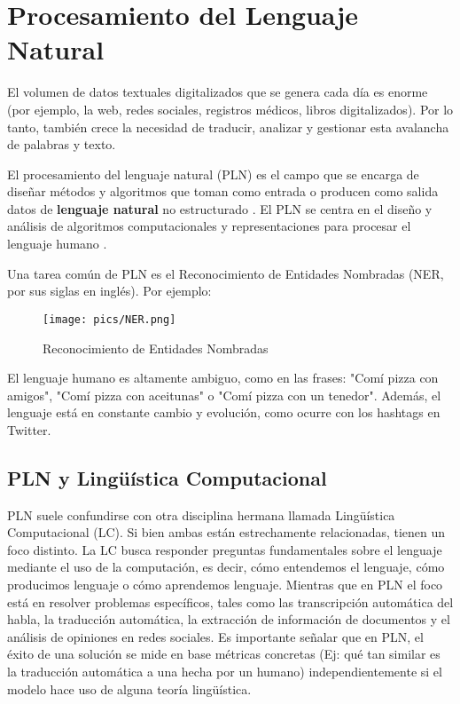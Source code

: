 \documentclass{book}
\begin{document}
\chapter{Procesamiento del Lenguaje Natural}

El volumen de datos textuales digitalizados que se genera cada día es enorme (por ejemplo, la web, redes sociales, registros médicos, libros digitalizados). Por lo tanto, también crece la necesidad de traducir, analizar y gestionar esta avalancha de palabras y texto.

El procesamiento del lenguaje natural (PLN) es el campo que se encarga de diseñar métodos y algoritmos que toman como entrada o producen como salida datos de \textbf{lenguaje natural} no estructurado \cite{goldberg2017neural}. El PLN se centra en el diseño y análisis de algoritmos computacionales y representaciones para procesar el lenguaje humano \cite{jacobbook}.





Una tarea común de PLN es el Reconocimiento de Entidades Nombradas (NER, por sus siglas en inglés). Por ejemplo:

\begin{figure}[h]
	\texttt{[image: pics/NER.png]}
	\caption{Reconocimiento de Entidades Nombradas}
\end{figure}

El lenguaje humano es altamente ambiguo, como en las frases: "Comí pizza con amigos", "Comí pizza con aceitunas" o "Comí pizza con un tenedor". Además, el lenguaje está en constante cambio y evolución, como ocurre con los hashtags en Twitter.

\section{PLN y Lingüística Computacional}
PLN suele confundirse con otra disciplina hermana llamada Lingüística Computacional (LC). Si bien ambas están estrechamente relacionadas, tienen un foco distinto. La LC busca responder preguntas fundamentales sobre el lenguaje mediante el uso de la computación, es decir, cómo entendemos el lenguaje, cómo producimos lenguaje o cómo aprendemos lenguaje. Mientras que en PLN el foco está en resolver problemas específicos, tales como las transcripción automática del habla, la traducción automática, la extracción de información de documentos y el análisis de opiniones en redes sociales. Es importante señalar que en PLN, el éxito de una solución se mide en base métricas concretas (Ej: qué tan similar es la traducción automática a una hecha por un humano) independientemente si el modelo hace uso de alguna teoría lingüística.
\end{document}
